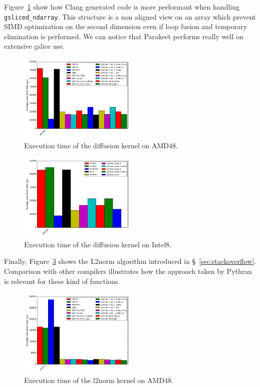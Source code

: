 \documentclass[10pt, preprint]{sigplanconf}
\begin{document}
Figure~\ref{fig:diffusion} show how Clang generated code is more performant
when handling \lstinline{gsliced_ndarray}.
This structure is a non aligned view on an array which prevent SIMD optimization
on the second dimension even if loop fusion and temporary elimination is
performed.  We can notice that Parakeet performs really well on
extensive gslice use.

\begin{figure}[t]
\centering
\includegraphics[width=0.5\textwidth]{diffusion_amd48.png}
\caption{Execution time of the diffusion kernel on AMD48.}
\label{fig:diffusion}
\end{figure}

\begin{figure}[t]
\centering
\includegraphics[width=0.5\textwidth]{diffusion_intel8.png}
\caption{Execution time of the diffusion kernel on Intel8.}
\label{fig:diffusion_intel8}
\end{figure}

Finally, Figure~\ref{fig:l2norme} shows the L2norm algorithm introduced in
\S~\ref{sec:stackoverflow}. Comparison with other compilers illustrates how the
approach taken by Pythran is relevant for these kind of functions.
\begin{figure}[t]
\centering
\includegraphics[width=0.5\textwidth]{l2norm_amd48.png}
\caption{Execution time of the l2norm kernel on AMD48.}
\label{fig:l2norme}
\end{figure}
\end{document}
